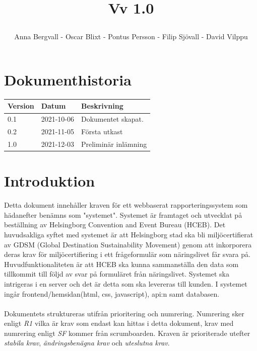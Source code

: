 \documentclass{article}
\date {#1}
\title {
    \documentNumber {01}    

    \documentTitle {Helsingborg Event and Convention Bureau}
    
    \documentDate {2021-12-03}
    \documentVersion Vv 1.0
    
    \author{Anna Bergvall - Oscar Blixt - Pontus Persson - Filip Sjövall - David Vilppu}
}
\begin{document}
\maketitle

\thispagestyle{empty}



\newpage

\tableofcontents


\newpage

\section{Dokumenthistoria}
\begin{tabular}{ l | l | l }
    Version & Datum & Beskrivning \\
    \hline
    0.1 & 2021-10-06 & Dokumentet skapat. \\
    0.2 & 2021-11-05 & Första utkast\\
    1.0 & 2021-12-03 & Preliminär inlämning\\
    
\end{tabular}

\section{Introduktion}

    Detta dokument innehåller kraven för ett webbaserat rapporteringssystem som hädanefter benämns som "systemet". Systemet är framtaget och utvecklat på beställning av Helsingborg Convention and Event Bureau (HCEB). Det huvudsakliga syftet med systemet är att Helsingborg stad ska bli miljöcertifierat av GDSM (Global Destination Sustainability Movement) genom att inkorporera deras krav för miljöcertifiering i ett frågeformulär som näringslivet får svara på. Huvudfunktionaliteten är att HCEB ska kunna sammanställa den data som tillkommit till följd av svar på formuläret från näringslivet. Systemet ska intrigeras i en server och det är detta som ska levereras till kunden. I systemet ingår frontend/hemsidan(html, css, javascript), api:n samt databasen. 
    \\\\
    Dokumentets struktureras utifrån prioritering och numrering. Numrering sker enligt \textit{R1} vilka är krav som endast kan hittas i detta dokument, krav med numrering enligt \textit{SF} kommer från scrumboarden. Kraven är prioriterade utefter \textit{stabila krav}, \textit{ändringsbenägna krav} och \textit{uteslutna krav}. 
    
\end{document}
